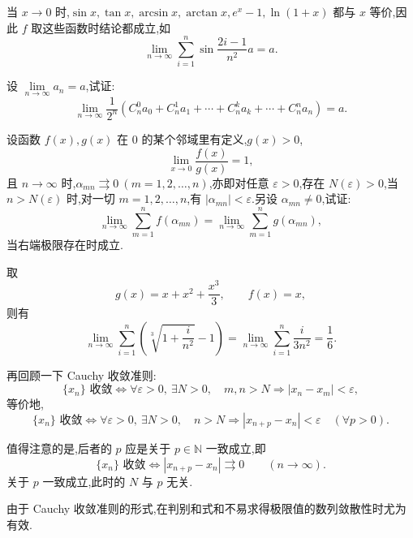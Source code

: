 \documentclass[../数学分析培优讲义.tex]{subfiles}
\begin{document}
\begin{remark}
当 $x\to0$ 时,$\sin x,\tan x,\arcsin x,\arctan x,e^x-1,\ln(1+x)$ 都与 $x$ 等价,因此 $f$ 取这些函数时结论都成立,如
\[
\lim\limits_{n\to\infty}\sum\limits_{i=1}^n
\sin\dfrac{2i-1}{n^2}a=a.
\]
\end{remark}

\begin{example}
设 $\displaystyle \lim\limits_{n\to\infty}a_n=a$,试证:
\[
\lim\limits_{n\to\infty}\dfrac{1}{2^n}
\left(
C_{n}^{0}a_0+C_{n}^{1}a_1+\cdots+C_{n}^{k}a_k+\cdots+C_{n}^{n}a_n
\right)=a.
\]
\end{example}
\exampleblank

\begin{example}
设函数 $f(x),g(x)$ 在 $0$ 的某个邻域里有定义,$g(x)>0$,
\[
\lim\limits_{x\to0}\dfrac{f(x)}{g(x)}=1,
\]
且 $n\to\infty$ 时,$\alpha_{mn}\rightrightarrows0\ (m=1,2,\ldots,n)$,亦即对任意
$\varepsilon>0$,存在 $N(\varepsilon)>0$,当 $n>N(\varepsilon)$ 时,对一切
$m=1,2,\ldots,n$,有 $|\alpha_{mn}|<\varepsilon$.另设 $\alpha_{mn}\neq0$,试证:
\[
\lim\limits_{n\to\infty}\sum\limits_{m=1}^n f(\alpha_{mn})
=
\lim\limits_{n\to\infty}\sum\limits_{m=1}^n g(\alpha_{mn}),
\]
当右端极限存在时成立.
\end{example}
\exampleblank

\begin{remark}
取
\[
g(x)=x+x^2+\dfrac{x^3}{3},\qquad f(x)=x,
\]
则有
\[
\lim\limits_{n\to\infty}\sum\limits_{i=1}^n
\left(\sqrt[3]{1+\dfrac{i}{n^2}}-1\right)
=
\lim\limits_{n\to\infty}\sum\limits_{i=1}^n\dfrac{i}{3n^2}
=\dfrac{1}{6}.
\]
\end{remark}


\newpage


再回顾一下 Cauchy 收敛准则:
\[
\{x_n\}\text{ 收敛}
\iff
\forall\varepsilon>0,\ \exists N>0,
\quad m,n>N\Longrightarrow |x_n-x_m|<\varepsilon,
\]
等价地,
\[
\{x_n\}\text{ 收敛}
\iff
\forall\varepsilon>0,\ \exists N>0,
\quad n>N\Longrightarrow |x_{n+p}-x_n|<\varepsilon\quad(\forall p>0).
\]

\begin{remark}
值得注意的是,后者的 $p$ 应是关于 $p\in\mathbb N$ 一致成立,即
\[
\{x_n\}\text{ 收敛}
\iff
|x_{n+p}-x_n|\rightrightarrows0\qquad(n\to\infty).
\]
关于 $p$ 一致成立,此时的 $N$ 与 $p$ 无关.
\end{remark}

由于 Cauchy 收敛准则的形式,在判别和式和不易求得极限值的数列敛散性时尤为有效.
\end{document}
